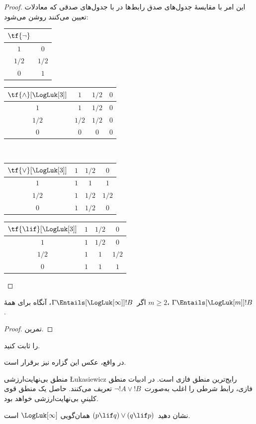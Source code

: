 \documentclass[../../../include/open-logic-section]{subfiles}
\begin{document}
\begin{proof}
  این امر با مقایسهٔ جدول‌های صدق رابط‌ها در
   با جدول‌های صدقی که معادلات
   تعیین می‌کنند روشن می‌شود:
  \begin{center}
    \begin{tabular}{c|c} 
      $\tf{\lnot}$ & \\ 
      \hline  
      $1$ & $0$ \\ 
      $1/2$ & $1/2$ \\
      $0$ & $1$ 
    \end{tabular}
    \quad
    \begin{tabular}{c|ccc} 
      $\tf{\land}[\LogLuk[3]]$ & $1$ & $1/2$ & $0$ \\ 
      \hline 
      $1$ & $1$ & $1/2$ & $0$ \\ 
      $1/2$ & $1/2$ & $1/2$ & $0$\\ 
      $0$ & $0$ & $0$ & $0$ 
    \end{tabular}
    \\[2ex]
    \begin{tabular}{c|ccc} 
      $\tf{\lor}[\LogLuk[3]]$ & $1$ & $1/2$ & $0$ \\ 
      \hline 
      $1$ & $1$ & $1$ & $1$ \\ 
      $1/2$ & $1$ & $1/2$ & $1/2$ \\
      $0$ & $1$ & $1/2$ & $0$ 
    \end{tabular}
    \quad
    \begin{tabular}{c|ccc} 
      $\tf{\lif}[\LogLuk[3]]$ & $1$ & $1/2$ & $0$ \\ 
      \hline 
      $1$ & $1$ & $1/2$ & $0$ \\ 
      $1/2$ & $1$ & $1$ & $1/2$  \\ 
      $0$ & $1$ & $1$ & $1$ 
    \end{tabular}
  \end{center} 
\end{proof}

\begin{prop}
  اگر~$\Gamma \Entails[\LogLuk[\infty]] !B$، آنگاه برای همهٔ
  $m \ge 2$، $\Gamma \Entails[\LogLuk[m]] !B$.
\end{prop}

\begin{proof}
  تمرین.
\end{proof}

\begin{prob}
   را ثابت کنید.
\end{prob}

در واقع، عکس این گزاره نیز برقرار است.

منطق بی‌نهایت‌ارزشی \L ukasiewicz رایج‌ترین منطق فازی است. در ادبیات
منطق فازی، رابط شرطی را اغلب به‌صورت~$\lnot !A \lor !B$ تعریف می‌کنند.
حاصل یک منطق قوی کلینیِ بی‌نهایت‌ارزشی خواهد بود.

\begin{prob}
  نشان دهید~$(p \lif q) \lor (q \lif p)$ همان‌گویی
  $\LogLuk[\infty]$ است.
\end{prob}
\end{document}
